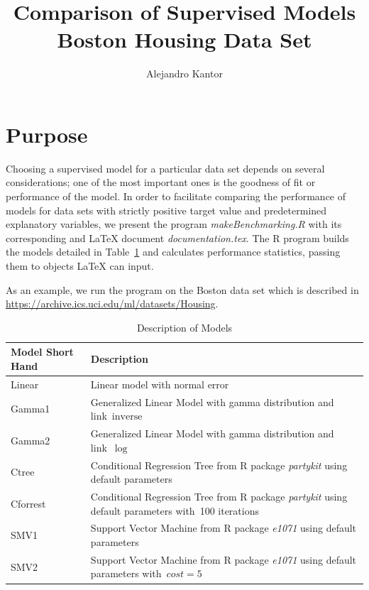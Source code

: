 \documentclass[10pt, letterpaper ]{article}
\title{Comparison of Supervised Models \\ Boston Housing Data Set}
\author{Alejandro Kantor}
\date{}
\begin{document}
 

\maketitle

\section{Purpose}


Choosing a supervised model for a particular data set depends on several considerations; one of the most important ones is the goodness of fit or performance of the model. In order to facilitate comparing the performance of models for data sets with strictly positive target value and predetermined explanatory variables, we present the program \emph{makeBenchmarking.R} with its corresponding and \LaTeX{} document \emph{documentation.tex}. The R program builds the models detailed in Table~\ref{ta:models} and calculates performance statistics, passing them to objects \LaTeX{} can input. 

As an example, we run the program on the Boston data set which is described in \\ \url{https://archive.ics.uci.edu/ml/datasets/Housing}. 

\begin{table}[h]
	\small
	\centering
	\begin{tabular}{lp{10cm}}
		\toprule
		Model Short Hand & Description \\
		\midrule
		Linear & Linear model with normal error \\
		Gamma1 & Generalized Linear Model with gamma distribution and link~$\mathrm{inverse}$\\
		Gamma2 & Generalized Linear Model with gamma distribution and link~$\log $\\
		Ctree & Conditional Regression Tree from R package \emph{partykit}  using default parameters \\
		Cforrest & Conditional Regression Tree from R package \emph{partykit} using default parameters with~100 iterations \\
		SMV1 &  Support Vector Machine from R package \emph{e1071} using default parameters  \\
		SMV2 & Support Vector Machine from R package \emph{e1071} using default parameters with~$cost = 5$\\
		\bottomrule
	\end{tabular}
	\caption{Description of Models}
	\label{ta:models}
\end{table}
\end{document}
